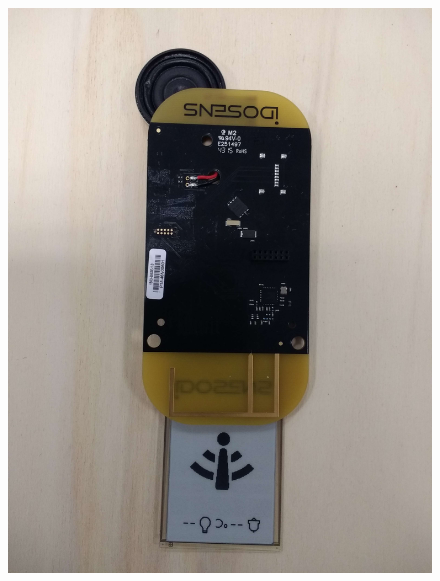\documentclass{article}
\begin{document}
\begin{figure}[H]
  \centering
  \begin{minipage}[b]{0.45\textwidth}
    \includegraphics[width=\textwidth]{base_face.jpg}
    

\end{minipage}
\end{figure}
\end{document}
